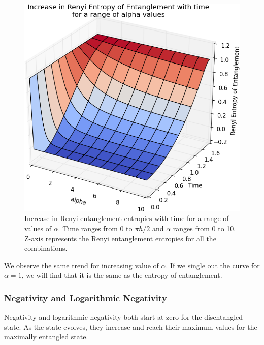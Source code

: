\begin{figure}[H]
  \begin{center}
    \includegraphics[scale=0.68]{figures/renyi-entg-3d.png}
    \caption{Increase in Renyi entanglement entropies with time for a range of values of $\alpha$. Time ranges from 0 to $\pi\hbar/2$ and $\alpha$ ranges from 0 to 10. Z-axis represents the Renyi entanglement entropies for all the combinations.}
    \label{fig: Time Evolution: Renyi Entanglement Entropies (3D)}
  \end{center}
\end{figure}

We observe the same trend for increasing value of $\alpha$. If we single out the curve for $\alpha=1$, we will find that it is the same as the entropy of entanglement.


\pagebreak
\subsubsection{Negativity and Logarithmic Negativity}
Negativity and logarithmic negativity both start at zero for the disentangled state. As the state evolves, they increase and reach their maximum values for the maximally entangled state.

